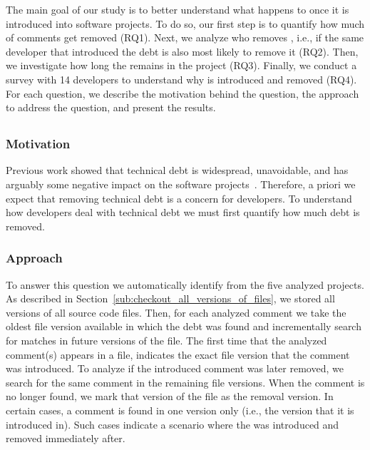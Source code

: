 
The main goal of our study is to better understand what happens to \SATD once it is introduced into software projects. To do so, our first step is to quantify how much of \SATD comments get removed (RQ1). Next, we analyze who removes \SATD, i.e., if the same developer that introduced the debt is also most likely to remove it (RQ2). Then, we investigate how long the \SATD remains in the project (RQ3). Finally, we conduct a survey with 14 developers to understand why \SATD is introduced and removed (RQ4). For each question, we describe the motivation behind the question, the approach to address the question, and present the results.



\subsection*{\rqi}
\subsubsection*{Motivation} Previous work showed that technical debt is widespread, unavoidable, and has arguably some negative impact on the software projects~\cite{Lim2012Software}. Therefore, a priori we expect that removing technical debt is a concern for developers. To understand how developers deal with  technical debt we must first quantify how much debt is removed. 


\subsubsection*{Approach} To answer this question we automatically identify \SATD from the five analyzed projects. As described in Section~\ref{sub:checkout_all_versions_of_files}, we stored all versions of all source code files. Then, for each analyzed \SATD comment we take the oldest file version available in which the debt was found and incrementally search for matches in future versions of the file. The first time that the analyzed \SATD comment(s) appears in a file, indicates the exact file version that the \SATD comment was introduced. To analyze if the introduced \SATD comment was later removed, we search for the same comment in the remaining file versions. When the comment is no longer found, we mark that version of the file as the removal version. In certain cases, a \SATD comment is found in one version only (i.e., the version that it is introduced in). Such cases indicate a scenario where the \SATD was introduced and removed immediately after. 

